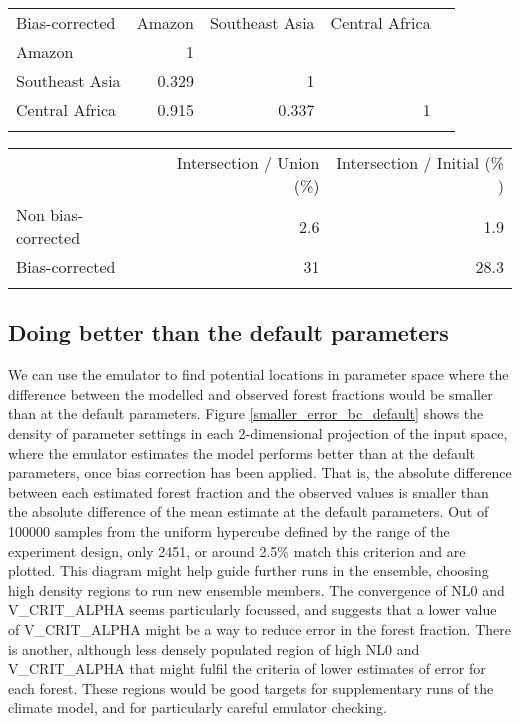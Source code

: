\documentclass[gmd, manuscript]{copernicus}
\begin{document}
\begin{table*}[t]
\caption{.}
\begin{tabular}{lrrrr}
\tophline

Bias-corrected      & Amazon & Southeast Asia & Central Africa  \\
\middlehline
Amazon                &          1        &             &     \\
Southeast Asia      &        0.329  &           1   &    \\
Central Africa         &    0.915 & 0.337  &   1 \\
\bottomhline
\end{tabular}
\belowtable{} %
\label{tab:}
\end{table*}


\begin{table*}[t]
\caption{.}
\begin{tabular}{lrr}
\tophline

    & Intersection / Union (\%) & Intersection / Initial (\% ) \\
\middlehline
 Non bias-corrected & 2.6 &   1.9 \\
Bias-corrected  & 31 & 28.3 \\
\bottomhline
\end{tabular}
\belowtable{} %
\label{tab:}
\end{table*}


\subsection{Doing better than the default parameters}
We can use the emulator to find potential locations in parameter space where the difference between the modelled and observed forest fractions would be smaller than at the default parameters. Figure \ref{smaller_error_bc_default} shows the density of parameter settings in each 2-dimensional projection of the input space, where the emulator estimates the model performs better than at the default parameters, once bias correction has been applied. That is, the absolute difference between each estimated forest fraction and the observed values is smaller than the absolute difference of the mean estimate at the default parameters. Out of 100000 samples from the uniform hypercube defined by the range of the experiment design, only 2451, or around 2.5\% match this criterion and are plotted. This diagram might help guide further runs in the ensemble, choosing high density regions to run new ensemble members. The convergence of NL0 and V\_CRIT\_ALPHA seems particularly focussed, and suggests that a lower value of V\_CRIT\_ALPHA might be a way to reduce error in the forest fraction. There is another, although less densely populated region of high NL0 and V\_CRIT\_ALPHA that might fulfil the criteria of lower estimates of error for each forest. These regions would be good targets for supplementary runs of the climate model, and for particularly careful emulator checking. 
\end{document}
